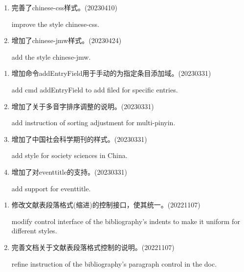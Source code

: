 

\label{up:20230424}
\begin{enumerate}

\item 完善了chinese-css样式。(20230410)

improve the style chinese-css.

\item 增加了chinese-jmw样式。(20230424)

add the style chinese-jmw.

\end{enumerate}

\label{up:20230331}
\begin{enumerate}

\item 增加命令addEntryField用于手动的为指定条目添加域。(20230331)

add cmd addEntryField to add filed for specific entries.


\item 增加了关于多音字排序调整的说明。(20230331)

add instruction of sorting adjustment for multi-pinyin.


\item 增加了中国社会科学期刊的样式。(20230331)

add style for society sciences in China.

\item 增加了对eventtitle的支持。(20230331)

add support for eventtitle.

\end{enumerate}


\label{up:20221107}
\begin{enumerate}


\item 修改文献表段落格式(缩进)的控制接口，使其统一。(20221107)

modify control interface of the bibliography's indents to make it uniform for different styles.

\item 完善文档关于文献表段落格式控制的说明。(20221107)

refine instruction of the bibliography's paragraph control in the doc.

\end{enumerate}


